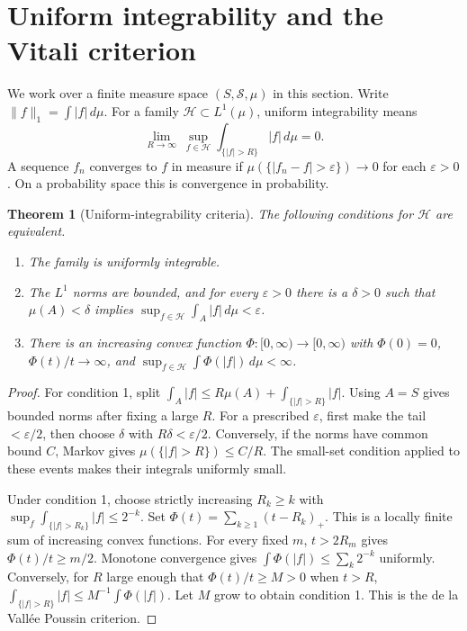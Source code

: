 \documentclass[11pt,oneside,openany]{book}
\theoremstyle{plain}
\newtheorem{theorem}{Theorem}[chapter]
\theoremstyle{definition}
\theoremstyle{remark}
\begin{document}
\section{Uniform integrability and the Vitali criterion}
\label{p01-05}

We work over a finite measure space \((S,\mathcal S,\mu)\) in this
section. Write \(\|f\|_1=\int |f|\,d\mu\). For a family
\(\mathcal H\subset L^1(\mu)\), uniform integrability means
\[
 \lim_{R\to\infty}\ \sup_{f\in\mathcal H}
 \int_{\{|f|>R\}} |f|\,d\mu=0.
\]
A sequence \(f_n\) converges to \(f\) in measure if
\(\mu(\{|f_n-f|>\varepsilon\})\to0\) for each \(\varepsilon>0\).
On a probability space this is convergence in probability.

\begin{theorem}[Uniform-integrability criteria]
\label{thm:prob-ui}
The following conditions for \(\mathcal H\) are equivalent.
\begin{enumerate}
\item The family is uniformly integrable.
\item The \(L^1\) norms are bounded, and for every \(\varepsilon>0\)
there is a \(\delta>0\) such that
\(\mu(A)<\delta\) implies \(\sup_{f\in\mathcal H}\int_A|f|\,d\mu
 <\varepsilon\).
\item There is an increasing convex function
\(\Phi\colon[0,\infty)\to[0,\infty)\) with \(\Phi(0)=0\),
\(\Phi(t)/t\to\infty\), and
\(\sup_{f\in\mathcal H}\int\Phi(|f|)\,d\mu<\infty\).
\end{enumerate}
\end{theorem}
\begin{proof}
For condition 1, split
\(\int_A |f|\le R\mu(A)+\int_{\{|f|>R\}}|f|\).
Using \(A=S\) gives bounded norms after fixing a large \(R\). For a
prescribed \(\varepsilon\), first make the tail \(<\varepsilon/2\),
then choose \(\delta\) with \(R\delta<\varepsilon/2\). Conversely,
if the norms have common bound \(C\), Markov gives
\(\mu(\{|f|>R\})\le C/R\). The small-set condition applied to these
events makes their integrals uniformly small.

Under condition 1, choose strictly increasing \(R_k\ge k\) with
\(\sup_f\int_{\{|f|>R_k\}}|f|\le 2^{-k}\). Set
\(\Phi(t)=\sum_{k\ge1}(t-R_k)_+\). This is a locally finite sum of
increasing convex functions. For every fixed \(m\), \(t>2R_m\)
gives \(\Phi(t)/t\ge m/2\). Monotone convergence gives
\(\int\Phi(|f|)\le\sum_k2^{-k}\) uniformly. Conversely, for \(R\)
large enough that \(\Phi(t)/t\ge M>0\) when \(t>R\),
\(\int_{\{|f|>R\}}|f|\le M^{-1}\int\Phi(|f|)\).
Let \(M\) grow to obtain condition 1. This is the de la Vall\'ee
Poussin criterion.
\end{proof}
\end{document}
